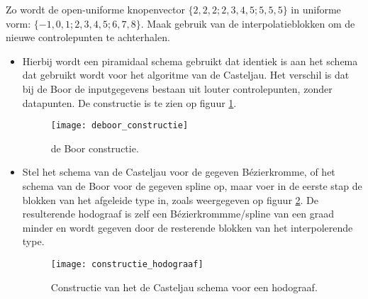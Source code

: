 \begin{itemize}
{\begin{itemize}
			
			Zo wordt de open-uniforme knopenvector $\{2, 2, 2; 2, 3, 4, 5; 5, 5, 5\}$ in uniforme vorm: $\{-1, 0, 1; 2, 3, 4, 5 ; 6, 7, 8 \}$.
			Maak gebruik van de interpolatieblokken om de nieuwe controlepunten te achterhalen.
		\end{itemize}
		}
	{
		\begin{itemize} 
			\item Hierbij wordt een piramidaal schema gebruikt dat identiek is aan het schema dat gebruikt wordt voor het algoritme van de Casteljau. Het verschil is dat bij de Boor de inputgegevens bestaan uit louter controlepunten, zonder datapunten. De constructie is te zien op figuur \ref{fig:deboor_constructie}.

			\begin{figure}[ht]
				\centering
				\texttt{[image: deboor\_constructie]}
				\caption{de Boor constructie.}
				\label{fig:deboor_constructie}
			\end{figure}
		\end{itemize}
		}
	{
		\begin{itemize}
			\item Stel het schema van de Casteljau voor de gegeven Bézierkromme, of het schema van de Boor voor de gegeven spline op, maar voer in de eerste stap de blokken van het afgeleide type in, zoals weergegeven op figuur \ref{fig:constructie_hodograaf}. De resulterende hodograaf is zelf een Bézierkrommme/spline van een graad minder en wordt gegeven door de resterende blokken van het interpolerende type.
			\begin{figure}[ht]
				\centering
				\texttt{[image: constructie\_hodograaf]}	
				\caption{Constructie van het de Casteljau schema voor een hodograaf.}
				\label{fig:constructie_hodograaf}
			\end{figure}
		\end{itemize}
		
}
\end{itemize}
